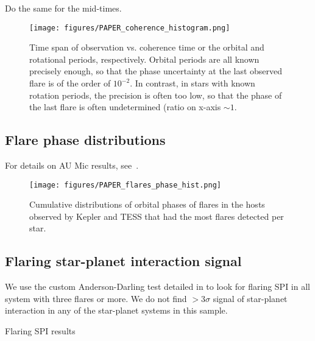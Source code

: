 \documentclass[twocolumn]{aastex631}
\begin{document}
Do the same for the mid-times.

\begin{figure}[ht!]
    \begin{centering}
        \texttt{[image: figures/PAPER\_coherence\_histogram.png]}
        \caption{
           Time span of observation vs. coherence time or the orbital and rotational periods, respectively. Orbital periods are all known precisely enough, so that the phase uncertainty at the last observed flare is of the order of $10^{-2}$. In contrast, in stars with known rotation periods, the precision is often too low, so that the phase of the last flare is often undetermined (ratio on x-axis $\sim 1$.
        }
        \label{fig:coherence_hist}
    \end{centering}
\end{figure}

\subsection{Flare phase distributions}

For details on AU Mic results, see~\citep{ilin2022searching}.

\begin{figure*}[ht!]
    \begin{centering}
        \texttt{[image: figures/PAPER\_flares\_phase\_hist.png]}
        \caption{
            Cumulative distributions of orbital phases of flares in the hosts observed by Kepler and TESS that had the most flares detected per star. 
        }
        \label{fig:cumdist_active}
    \end{centering}
\end{figure*}


\subsection{Flaring star-planet interaction signal}
We use the custom Anderson-Darling test detailed in \cite{ilin2022searching} to look for flaring SPI in all system with three flares or more. We do not find $>3\sigma$ signal of star-planet interaction in any of the star-planet systems in this sample.  



\begin{table*}
    \centering
            \caption{
           Flaring SPI results
        }
    
        \label{tab:maintable}
\end{table*}
\end{document}

